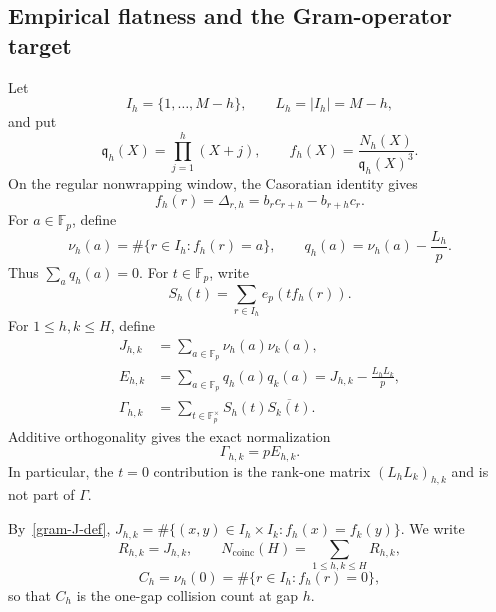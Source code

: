\subsection{Empirical flatness and the Gram-operator target}
\label{gram-subsection}

Let
\[
 I_h=\{1,\ldots,M-h\},\qquad L_h=|I_h|=M-h,
\]
and put
\[
 \mathfrak q_h(X)=\prod_{j=1}^h(X+j),\qquad
 f_h(X)=\frac{N_h(X)}{\mathfrak q_h(X)^3}.
\]
On the regular nonwrapping window, the Casoratian identity gives
\[
 f_h(r)=\Delta_{r,h}
 =b_rc_{r+h}-b_{r+h}c_r.
\]
For $a\in\mathbb F_p$, define
\[
 \nu_h(a)=\#\{r\in I_h:f_h(r)=a\},\qquad
 q_h(a)=\nu_h(a)-\frac{L_h}{p}.
\]
Thus $\sum_aq_h(a)=0$.  For $t\in\mathbb F_p$, write
\[
 S_h(t)=\sum_{r\in I_h}e_p(tf_h(r)).
\]
For $1\le h,k\le H$, define
\begin{align}
 J_{h,k}
 &=\sum_{a\in\mathbb F_p}\nu_h(a)\nu_k(a),
 \label{gram-J-def}\\
 E_{h,k}
 &=\sum_{a\in\mathbb F_p}q_h(a)q_k(a)
 =J_{h,k}-\frac{L_hL_k}{p},
 \label{gram-E-def}\\
 \Gamma_{h,k}
 &=\sum_{t\in\mathbb F_p^\times}
   S_h(t)\overline{S_k(t)}.
 \label{gram-Gamma-def}
\end{align}
Additive orthogonality gives the exact normalization
\begin{equation}
 \boxed{\Gamma_{h,k}=pE_{h,k}.}
 \label{gram-fourier-normalization}
\end{equation}
In particular, the $t=0$ contribution is the rank-one matrix
$(L_hL_k)_{h,k}$ and is not part of $\Gamma$.

By~\eqref{gram-J-def},
$J_{h,k}=\#\{(x,y)\in I_h\times I_k:f_h(x)=f_k(y)\}$.  We write
\[
 R_{h,k}=J_{h,k},
 \qquad
 N_{\mathrm{coinc}}(H)=\sum_{1\le h,k\le H}R_{h,k},
\]
\[
 C_h=\nu_h(0)=\#\{r\in I_h:f_h(r)=0\},
\]
so that $C_h$ is the one-gap collision count at gap $h$.

